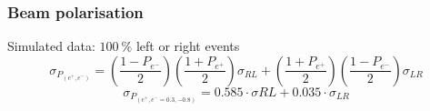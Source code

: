 \documentclass{beamer}
\begin{document}
  \begin{frame}[plain]
    \frametitle{Beam polarisation}

    \begin{block}{Simulated data: $100~\%$ left or right events}
      \footnotesize{
      \[ \sigma_{P_{(e^+,e^-)}} = \left( \frac{1-P_{e^-}}{2} \right) \left( \frac{1+P_{e^+}}{2} \right) \sigma_{RL} + \left( \frac{1+P_{e^+}}{2} \right) \left( \frac{1-P_{e^-}}{2} \right) \sigma_{LR} \]
      \[ \sigma_{P_{(e^+,e^- = 0.3, -0.8)}} = 0.585 \cdot \sigma{RL} + 0.035 \cdot \sigma_{LR} \]
      }
    \end{block}
  \end{frame}




    



\end{document}
